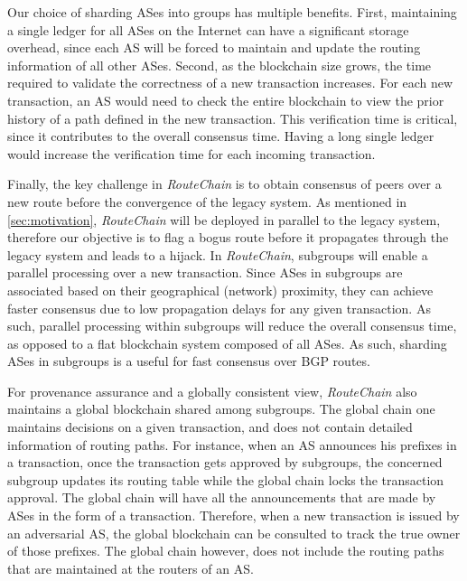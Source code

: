 \documentclass[5p]{elsarticle}
\newcommand{\rc}{{{\em RouteChain}}\xspace}
\begin{document}
Our choice of sharding ASes into groups has multiple benefits. First, maintaining a single ledger for all ASes on the Internet can have a significant storage overhead, since each AS will be forced to maintain and update the routing information of all other ASes.  %
Second, as the blockchain size grows, the time required to validate the correctness of a new transaction increases. For each new transaction, an AS would need to check the entire blockchain to view the prior history of a path defined in the new transaction. This verification time is critical, since it contributes to the overall consensus time. Having a long single ledger would increase the verification time for each incoming transaction. 

Finally, the key challenge in \rc is to obtain consensus of peers over a new route before the convergence of the legacy system. As mentioned in \textsection\ref{sec:motivation}, \rc will be deployed in parallel to the legacy system, therefore our objective is to flag a bogus route before it propagates through the legacy system and leads to a hijack. In \rc, subgroups will enable a parallel processing over a new transaction. Since ASes in subgroups are associated based on their geographical (network) proximity, they can achieve faster consensus due to low propagation delays for any given transaction. As such, parallel processing within subgroups will reduce the overall consensus time, as opposed to a flat blockchain system composed of all ASes. As such, sharding ASes in subgroups is a useful for fast consensus over BGP routes. 

For provenance assurance and a globally consistent view, \rc also maintains a global blockchain shared among subgroups. The global chain one maintains decisions on a given transaction, and does not contain detailed information of routing paths. For instance, when an AS announces his prefixes in a transaction, once the transaction gets approved by subgroups, the concerned subgroup updates its routing table while the global chain locks the transaction approval. The global chain will have all the announcements that are made by ASes in the form of a transaction. Therefore, when a new transaction is issued by an adversarial AS, the global blockchain can be consulted to track the true owner of those prefixes. The global chain however, does not include the routing paths that are maintained at the routers of an AS. 
\end{document}
